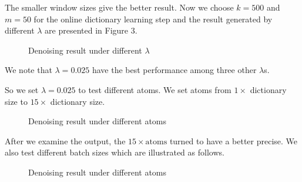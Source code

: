 \documentclass[UTF8]{article}
\begin{document}
The smaller window sizes give the better result. Now we choose $k = 500$ and $m = 50$ for the online dictionary learning step and the result generated by different $\lambda$ are presented in Figure 3.


\begin{figure}[H]
    \centering
    \caption{Denoising result under different $\lambda$}
\end{figure}

We note that $\lambda = 0.025$ have the best performance among three other  $\lambda$s.

So we set $\lambda = 0.025$ to test different atoms. We set atoms from $ 1 \times$ dictionary size to $ 15 \times$ dictionary size.

\begin{figure}[H]
    \centering
    \caption{Denoising result under different atoms}
\end{figure}

After we examine the output, the $15 \times \text{atoms}$ turned to have a better precise. We also test different batch sizes which are illustrated as follows.

\begin{figure}[H]
    \centering
    \caption{Denoising result under different atoms}
\end{figure}
\end{document}
